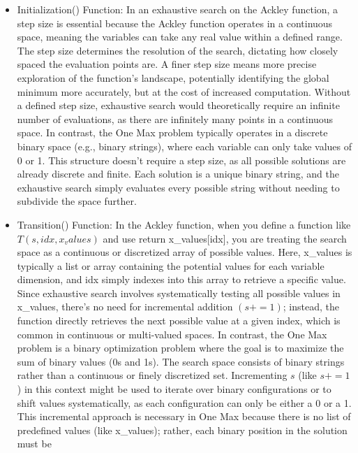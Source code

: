 \documentclass[
  letterpaper,
  DIV=11,
  numbers=noendperiod]{scrreprt}
\providecommand{\tightlist}{%
  \setlength{\itemsep}{0pt}\setlength{\parskip}{0pt}}\usepackage{longtable,booktabs,array}
\begin{document}
\begin{itemize}
\tightlist
\item
  Initialization() Function: In an exhaustive search on the Ackley
  function, a step size is essential because the Ackley function
  operates in a continuous space, meaning the variables can take any
  real value within a defined range. The step size determines the
  resolution of the search, dictating how closely spaced the evaluation
  points are. A finer step size means more precise exploration of the
  function's landscape, potentially identifying the global minimum more
  accurately, but at the cost of increased computation. Without a
  defined step size, exhaustive search would theoretically require an
  infinite number of evaluations, as there are infinitely many points in
  a continuous space. In contrast, the One Max problem typically
  operates in a discrete binary space (e.g., binary strings), where each
  variable can only take values of 0 or 1. This structure doesn't
  require a step size, as all possible solutions are already discrete
  and finite. Each solution is a unique binary string, and the
  exhaustive search simply evaluates every possible string without
  needing to subdivide the space further.
\item
  Transition() Function: In the Ackley function, when you define a
  function like \(T(s, idx, x_values)\) and use return
  x\_values{[}idx{]}, you are treating the search space as a continuous
  or discretized array of possible values. Here, x\_values is typically
  a list or array containing the potential values for each variable
  dimension, and idx simply indexes into this array to retrieve a
  specific value. Since exhaustive search involves systematically
  testing all possible values in x\_values, there's no need for
  incremental addition \((s += 1)\); instead, the function directly
  retrieves the next possible value at a given index, which is common in
  continuous or multi-valued spaces. In contrast, the One Max problem is
  a binary optimization problem where the goal is to maximize the sum of
  binary values (0s and 1s). The search space consists of binary strings
  rather than a continuous or finely discretized set. Incrementing \(s\)
  (like \(s += 1\)) in this context might be used to iterate over binary
  configurations or to shift values systematically, as each
  configuration can only be either a 0 or a 1. This incremental approach
  is necessary in One Max because there is no list of predefined values
  (like x\_values); rather, each binary position in the solution must be

\end{itemize}
\end{document}
